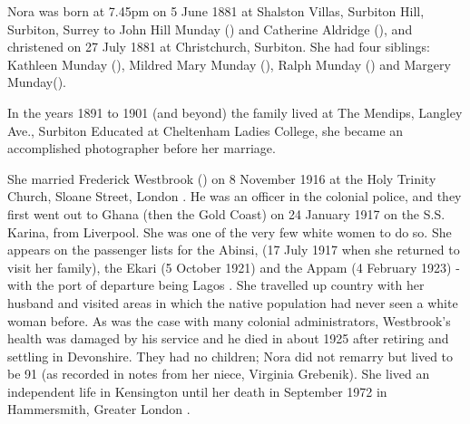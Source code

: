 
Nora was born at 7.45pm on 5 June 1881 at  Shalston Villas, Surbiton Hill,  Surbiton, Surrey to John Hill Munday () and Catherine Aldridge (), and christened on 27 July 1881 at Christchurch, Surbiton.\cite{NoraMundayBirth} 	She had four siblings: Kathleen Munday (), Mildred Mary Munday (), Ralph Munday () and Margery Munday().

In the years  1891 to 1901 (and beyond) the family lived at The Mendips, Langley Ave., Surbiton \cite{NoraMundayResidence}  Educated at Cheltenham Ladies College, she became an accomplished photographer before her marriage.
\cite{NoraMundayOccupation}

She married Frederick Westbrook () on 8 November 1916 at the Holy Trinity Church, Sloane Street, London \cite{NoraMundayMarriage}.  He was an officer in the colonial police, and they first went out to Ghana (then the Gold Coast) on 24 January 1917 on the S.S. Karina, from Liverpool. She was one of the very few white women to do so. She appears on the passenger lists for the Abinsi, (17 July 1917 when she returned to visit her family), the Ekari (5 October 1921) and the Appam (4 February 1923) - with the port of departure being Lagos \cite{NoraMundayTravel}. She travelled up country with her husband and visited areas in which the native population had never seen a white woman before. As was the case with many colonial administrators, Westbrook's health was damaged by his service and he died in about 1925 after retiring and settling in Devonshire. They had no children; Nora did not remarry but lived to be 91 (as recorded in notes from her niece, Virginia Grebenik). She lived an independent life in Kensington until her death in September 1972 in 	Hammersmith, Greater London \cite{NoraMundayDeath}.

